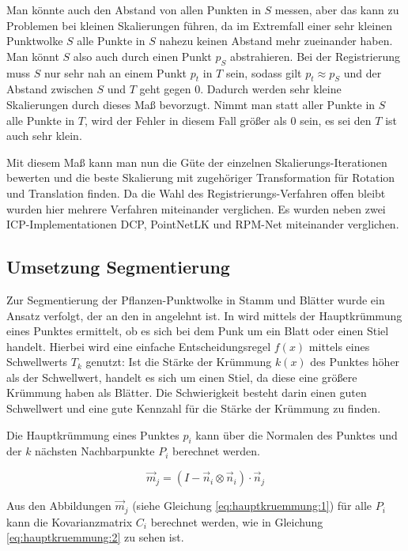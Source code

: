 \documentclass[12pt,titlepage, twoside]{article}
\begin{document}
Man könnte auch den Abstand von allen Punkten in $S$ messen, aber das kann zu Problemen bei kleinen Skalierungen führen, 
da im Extremfall einer sehr kleinen Punktwolke $S$ alle Punkte in $S$ nahezu keinen Abstand mehr zueinander haben.
Man könnt $S$ also auch durch einen Punkt $p_{S}$ abstrahieren.
Bei der Registrierung muss $S$ nur sehr nah an einem Punkt $p_t$ in $T$ sein, sodass gilt $p_t \approx p_S$ und der Abstand zwischen $S$ und $T$ geht gegen $0$. 
Dadurch werden sehr kleine Skalierungen durch dieses Maß bevorzugt.
Nimmt man statt aller Punkte in $S$ alle Punkte in $T$, wird der Fehler in diesem Fall größer als 0 sein, es sei den $T$ ist auch sehr klein.

Mit diesem Maß kann man nun die Güte der einzelnen Skalierungs-Iterationen bewerten und die beste Skalierung mit zugehöriger Transformation für Rotation und Translation finden.
Da die Wahl des Registrierungs-Verfahren offen bleibt wurden hier mehrere Verfahren miteinander verglichen. Es wurden neben zwei ICP-Implementationen DCP, PointNetLK und RPM-Net miteinander verglichen.

\subsection{Umsetzung Segmentierung}
\label{sec:realisierung:implementierung3}

Zur Segmentierung der Pflanzen-Punktwolke in Stamm und Blätter wurde ein Ansatz verfolgt, der an den in \cite{ThreeBasics} angelehnt ist.
In \cite{ThreeBasics} wird mittels der Hauptkrümmung eines Punktes ermittelt, ob es sich bei dem Punk um ein Blatt oder einen Stiel handelt. 
Hierbei wird eine einfache Entscheidungsregel $f(x)$ mittels eines Schwellwerts $T_k$ genutzt: 
Ist die Stärke der Krümmung $k(x)$ des Punktes höher als der Schwellwert, handelt es sich um einen Stiel, da diese eine größere Krümmung haben als Blätter.
Die Schwierigkeit besteht darin einen guten Schwellwert und eine gute Kennzahl für die Stärke der Krümmung zu finden.

Die Hauptkrümmung eines Punktes $p_i$ kann über die Normalen des Punktes und der $k$ nächsten Nachbarpunkte $P_i$ berechnet werden.

\begin{equation}
\label{eq:hauptkruemmung:1}
\vec{m}_j = (I - \vec{n}_i \otimes \vec{n}_i ) \cdot \vec{n}_j
\end{equation}

Aus den Abbildungen $\vec{m}_j$ (siehe Gleichung \ref{eq:hauptkruemmung:1}) für alle $P_i$ kann die Kovarianzmatrix $C_i$ berechnet werden, wie in Gleichung \ref{eq:hauptkruemmung:2} zu sehen ist.
\end{document}
